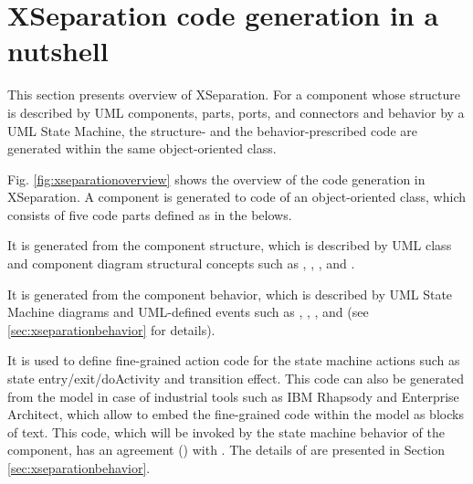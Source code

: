 \section{XSeparation code generation in a nutshell}
\label{sec:butshell}

This section presents overview of XSeparation.
For a component whose structure is described by UML components, parts, ports, and connectors and behavior by a UML State Machine, the structure- and the behavior-prescribed code are generated within the same object-oriented class. 

Fig. \ref{fig:xseparationoverview} shows the overview of the code generation in XSeparation.
A component  is generated to code of an object-oriented class, which consists of five code parts defined as in the belows.

\vskip 0.1cm
\noindent
{} It is generated from the component structure, which is described by UML class and component diagram structural concepts such as , , , and .

\vskip 0.1cm
\noindent	
{} It is generated from the component behavior, which is described by UML State Machine diagrams and UML-defined events such as , , , and  (see \ref{sec:xseparationbehavior} for details).

\vskip 0.1cm
\noindent	
{} It is used to define fine-grained action code for the state machine actions such as state entry/exit/doActivity and transition effect.
This code can also be generated from the model in case of industrial tools such as IBM Rhapsody and Enterprise Architect, which allow to embed the fine-grained code within the model as blocks of text.
This code, which will be invoked by the state machine behavior of the component, has an agreement () with .
The details of  are presented in Section \ref{sec:xseparationbehavior}. 

